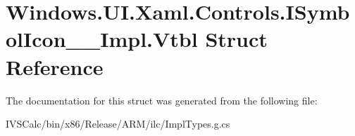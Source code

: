 \hypertarget{struct_windows_1_1_u_i_1_1_xaml_1_1_controls_1_1_i_symbol_icon_____impl_1_1_vtbl}{}\section{Windows.\+U\+I.\+Xaml.\+Controls.\+I\+Symbol\+Icon\+\_\+\+\_\+\+Impl.\+Vtbl Struct Reference}
\label{struct_windows_1_1_u_i_1_1_xaml_1_1_controls_1_1_i_symbol_icon_____impl_1_1_vtbl}


The documentation for this struct was generated from the following file\+:\begin{DoxyCompactItemize}
\item 
I\+V\+S\+Calc/bin/x86/\+Release/\+A\+R\+M/ilc/Impl\+Types.\+g.\+cs\end{DoxyCompactItemize}
